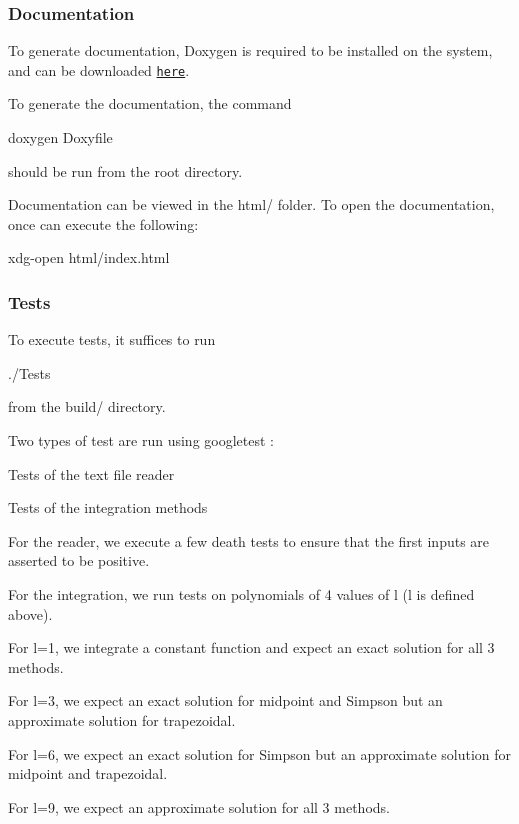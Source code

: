 \subsubsection*{Documentation}

To generate documentation, Doxygen is required to be installed on the system, and can be downloaded \href{https://www.doxygen.nl/download.html}{\tt here}.
\begin{DoxyItemize}
\item To generate the documentation, the command 
\begin{DoxyCode}
doxygen Doxyfile
\end{DoxyCode}
 should be run from the root directory.
\item Documentation can be viewed in the {\ttfamily html/} folder. To open the documentation, once can execute the following\+: 
\begin{DoxyCode}
xdg-open html/index.html
\end{DoxyCode}

\end{DoxyItemize}

\subsubsection*{Tests}

To execute tests, it suffices to run 
\begin{DoxyCode}
./Tests
\end{DoxyCode}
 from the {\ttfamily build/} directory.

Two types of test are run using googletest \+:
\begin{DoxyItemize}
\item Tests of the text file reader
\item Tests of the integration methods
\end{DoxyItemize}

For the reader, we execute a few death tests to ensure that the first inputs are asserted to be positive.

For the integration, we run tests on polynomials of 4 values of l (l is defined above).
\begin{DoxyItemize}
\item For l=1, we integrate a constant function and expect an exact solution for all 3 methods.
\item For l=3, we expect an exact solution for midpoint and Simpson but an approximate solution for trapezoidal.
\item For l=6, we expect an exact solution for Simpson but an approximate solution for midpoint and trapezoidal.
\item For l=9, we expect an approximate solution for all 3 methods.
\end{DoxyItemize}

